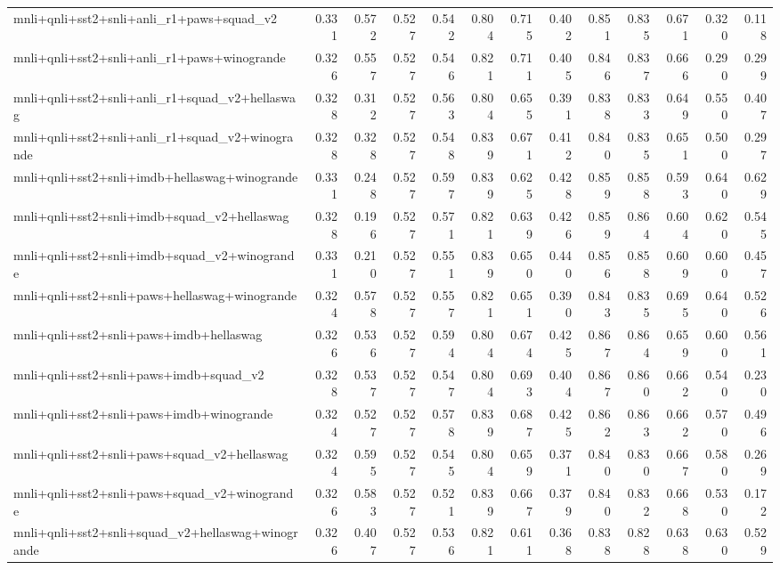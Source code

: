 \begin{table}[t]
\begin{tabular}{lrrrrrrrrrrrr}
    mnli+qnli+sst2+snli+anli\_r1+paws+squad\_v2 & 0.331 & 0.572 & 0.527 & 0.542 & 0.804 & 0.715 & 0.402 & 0.851 & 0.835 & 0.671 & 0.320 & 0.118 \\
    mnli+qnli+sst2+snli+anli\_r1+paws+winogrande & 0.326 & 0.557 & 0.527 & 0.546 & 0.821 & 0.711 & 0.405 & 0.846 & 0.837 & 0.666 & 0.290 & 0.299 \\
    mnli+qnli+sst2+snli+anli\_r1+squad\_v2+hellaswag & 0.328 & 0.312 & 0.527 & 0.563 & 0.804 & 0.655 & 0.391 & 0.838 & 0.833 & 0.649 & 0.550 & 0.407 \\
    mnli+qnli+sst2+snli+anli\_r1+squad\_v2+winogrande & 0.328 & 0.328 & 0.527 & 0.548 & 0.839 & 0.671 & 0.412 & 0.840 & 0.835 & 0.651 & 0.500 & 0.297 \\
    mnli+qnli+sst2+snli+imdb+hellaswag+winogrande & 0.331 & 0.248 & 0.527 & 0.597 & 0.839 & 0.625 & 0.428 & 0.859 & 0.858 & 0.593 & 0.640 & 0.629 \\
    mnli+qnli+sst2+snli+imdb+squad\_v2+hellaswag & 0.328 & 0.196 & 0.527 & 0.571 & 0.821 & 0.639 & 0.426 & 0.859 & 0.864 & 0.604 & 0.620 & 0.545 \\
    mnli+qnli+sst2+snli+imdb+squad\_v2+winogrande & 0.331 & 0.210 & 0.527 & 0.551 & 0.839 & 0.650 & 0.440 & 0.856 & 0.858 & 0.609 & 0.600 & 0.457 \\
    mnli+qnli+sst2+snli+paws+hellaswag+winogrande & 0.324 & 0.578 & 0.527 & 0.557 & 0.821 & 0.651 & 0.390 & 0.843 & 0.835 & 0.695 & 0.640 & 0.526 \\
    mnli+qnli+sst2+snli+paws+imdb+hellaswag & 0.326 & 0.536 & 0.527 & 0.594 & 0.804 & 0.674 & 0.425 & 0.867 & 0.864 & 0.659 & 0.600 & 0.561 \\
    mnli+qnli+sst2+snli+paws+imdb+squad\_v2 & 0.328 & 0.537 & 0.527 & 0.547 & 0.804 & 0.693 & 0.404 & 0.867 & 0.860 & 0.662 & 0.540 & 0.230 \\
    mnli+qnli+sst2+snli+paws+imdb+winogrande & 0.324 & 0.527 & 0.527 & 0.578 & 0.839 & 0.687 & 0.425 & 0.862 & 0.863 & 0.662 & 0.570 & 0.496 \\
    mnli+qnli+sst2+snli+paws+squad\_v2+hellaswag & 0.324 & 0.595 & 0.527 & 0.545 & 0.804 & 0.659 & 0.371 & 0.840 & 0.830 & 0.667 & 0.580 & 0.269 \\
    mnli+qnli+sst2+snli+paws+squad\_v2+winogrande & 0.326 & 0.583 & 0.527 & 0.521 & 0.839 & 0.667 & 0.379 & 0.840 & 0.832 & 0.668 & 0.530 & 0.172 \\
    mnli+qnli+sst2+snli+squad\_v2+hellaswag+winogrande & 0.326 & 0.407 & 0.527 & 0.536 & 0.821 & 0.611 & 0.368 & 0.838 & 0.828 & 0.638 & 0.630 & 0.529 \\

\end{tabular}
\end{table}
